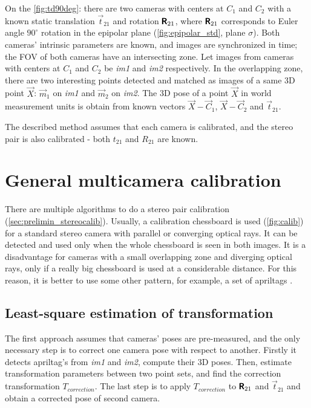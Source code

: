 On the \autoref{fig:td90deg}: there are two cameras with centers at $C_1$ and $C_2$ with a known static translation $\vec{t}_{21}$ and rotation $\pmb{\mathsf{R}}_{21}$, where $\pmb{\mathsf{R}}_{21}$ corresponds to Euler angle $90^\circ$ rotation in the epipolar plane (\autoref{fig:epipolar_std}, plane $\sigma$).
Both cameras' intrinsic parameters are known, and images are synchronized in time; the FOV of both cameras have an intersecting zone.
Let images from cameras with centers at $C_1$ and $C_2$ be \textit{im1} and \textit{im2} respectively.
In the overlapping zone, there are two interesting points detected and matched as images of a same 3D point $\vec{X}$: $\vec{m}_1$ on \textit{im1} and $\vec{m}_2$ on \textit{im2}.
The 3D pose of a point $\vec{X}$ in world measurement units is obtain from known vectors $\vec{X} - \vec{C}_1$, $\vec{X} - \vec{C}_2$ and $\vec{t}_{21}$. 

The described method assumes that each camera is calibrated, and the stereo pair is also calibrated - both $t_{21}$ and $R_{21}$ are known.

\section{General multicamera calibration}
There are multiple algorithms to do a stereo pair calibration (\autoref{sec:prelimin_stereocalib}). 
Usually, a calibration chessboard is used (\autoref{fig:calib}) for a standard stereo camera with parallel or converging optical rays.
It can be detected and used only when the whole chessboard is seen in both images.
It is a disadvantage for cameras with a small overlapping zone and diverging optical rays, only if a really big chessboard is used at a considerable distance.
For this reason, it is better to use some other pattern, for example, a set of apriltags \cite{Malyuta2019}. 

\subsection{Least-square estimation of transformation}
\label{sec:lsq_umeyama}
The first approach assumes that cameras' poses are pre-measured, and the only necessary step is to correct one camera pose with respect to another.
Firstly it detects apriltag's from \textit{im1} and \textit{im2}, compute their 3D poses.
Then, estimate transformation parameters between two point sets, and find the correction transformation $T_{correction}$.
The last step is to apply $T_{correction}$ to $\pmb{\mathsf{R}}_{21}$ and $\vec{t}_{21}$ and obtain a corrected pose of second camera.

